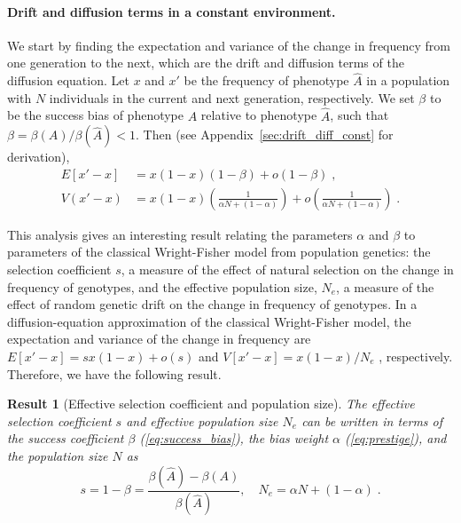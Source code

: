 \documentclass[12pt]{extarticle}
\newtheorem{result}{Result}
\begin{document}
\paragraph{Drift and diffusion terms in a constant environment.}
We start by finding the expectation and variance of the change in frequency from one generation to the next, which are the drift and diffusion terms of the diffusion equation.
Let $x$ and $x'$ be the frequency of phenotype $\hat{A}$ in a population with $N$ individuals in the current and next generation, respectively.
We set $\beta$ to be the success bias of phenotype $A$ relative to phenotype $\hat{A}$, such that $\beta = \beta(A)/\beta(\hat{A}) < 1$.
Then (see Appendix~\ref{sec:drift_diff_const} for derivation),
\begin{equation}\label{eq:drift_diff}
\begin{aligned}
E[x'-x] &= x(1-x)(1-\beta) + o(1-\beta)  \;, 
\\
V(x'-x) &= x(1-x)\left(\frac{1}{\alpha N + (1-\alpha)}\right) + o\left(\frac{1}{\alpha N + (1-\alpha)}\right) \;.
\end{aligned}\end{equation} 

This analysis gives an interesting result relating the parameters $\alpha$ and $\beta$ to parameters of the classical Wright-Fisher model from population genetics:
the selection coefficient $s$, a measure of the effect of natural selection on the change in frequency of genotypes, and the effective population size, $N_e$, a measure of the effect of random genetic drift on the change in frequency of genotypes. 
In a diffusion-equation approximation of the classical Wright-Fisher model, the expectation and variance of the change in frequency are $E[x'-x]=sx(1-x)+o(s)$ and $V[x'-x]=x(1-x)/N_e$ \citep[eq.~7]{kimura}{, respectively}. 
Therefore, we have the following result.\\

\begin{result}[Effective selection coefficient and population size]\label{res:selection_coef}
The effective selection coefficient $s$ and effective population size $N_e$ can be written in terms of the success coefficient $\beta$ (\cref{eq:success_bias}), the bias weight $\alpha$ (\cref{eq:prestige}), and the population size $N$ as 
\begin{equation}
s=1-\beta=\frac{\beta(\hat{A})-\beta(A)}{\beta(\hat{A})}, \quad N_e=\alpha N + (1-\alpha) \;.
\end{equation}
\end{result}
\end{document}
